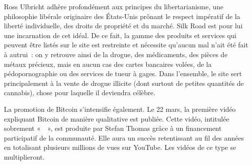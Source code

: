 Ross Ulbricht adhère profondément aux principes du libertarianisme, une philosophie libérale originaire des États-Unis prônant le respect impératif de la liberté individuelle, des droits de propriété et du marché. Silk Road est pour lui une incarnation de cet idéal. De ce fait, la gamme des produits et services qui peuvent être listés sur le site est restreinte et nécessite qu'aucun mal n'ait été fait à autrui~: on y retrouve ainsi de la drogue, des médicaments, des pièces de métaux précieux, mais en aucun cas des cartes bancaires volées, de la pédopornographie ou des services de tueur à gages. Dans l'ensemble, le site sert principalement à la vente de drogue illicite (dont surtout de petites quantités de cannabis), chose pour laquelle il deviendra célèbre. %


La promotion de Bitcoin s'intensifie également. Le 22 mars, la première vidéo expliquant Bitcoin de manière qualitative est publiée. Cette vidéo, intitulée sobrement «~~», est produite par Stefan Thomas grâce à un financement participatif de la communauté. Elle aura un succès retentissant au fil des années en totalisant plusieurs millions de vues sur YouTube. Les vidéos de ce type se multiplieront.

